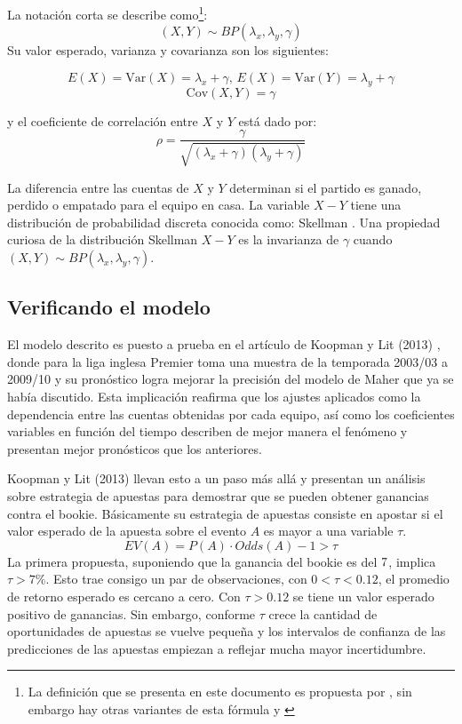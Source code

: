 La notación corta se describe como\footnote{La definición que se presenta en este documento es propuesta por \cite{koopman2013dynamic}, sin embargo hay otras variantes de esta fórmula \cite{kocherlakota1992bivariate} y \cite{johnson1997discrete}}:
\[(X,Y) \sim BP(\lambda_x,\lambda_y,\gamma)\]
Su valor esperado, varianza y covarianza son los siguientes:


\[E(X) = \mathrm{Var}(X) = \lambda_x + \gamma \text{, } E(X) = \mathrm{Var}(Y) = \lambda_y + \gamma\]
\[\mathrm{Cov}(X,Y) = \gamma\]


y el coeficiente de correlación entre $X$ y $Y$ está dado por:
\[\rho = \frac{\gamma}{\sqrt{(\lambda_x+\gamma)(\lambda_y+\gamma)}}\]

La diferencia entre las cuentas de $X$ y $Y$ determinan si el partido es ganado, perdido o empatado para el equipo en casa. La variable $X-Y$ tiene una distribución de probabilidad discreta conocida como: Skellman \cite{skellam1946frequency}. Una propiedad curiosa de la distribución Skellman $X-Y$ es la invarianza de $\gamma$ cuando $(X,Y) \sim BP(\lambda_x,\lambda_y,\gamma)$.

\subsection{Verificando el modelo}
\label{subsec:verification}

El modelo descrito es puesto a prueba en el artículo de Koopman y Lit (2013) \cite{koopman2013dynamic}, donde para la liga inglesa Premier toma una muestra de la temporada 2003/03 a 2009/10 y su pronóstico logra mejorar la precisión del modelo de Maher \cite{maher1982modelling} que ya se había discutido. Esta implicación reafirma que los ajustes aplicados como la dependencia entre las cuentas obtenidas por cada equipo, así como los coeficientes variables en función del tiempo describen de mejor manera el fenómeno y presentan mejor pronósticos que los anteriores.

Koopman y Lit (2013) \cite{koopman2013dynamic} llevan esto a un paso más allá y presentan un análisis sobre estrategia de apuestas para demostrar que se pueden obtener ganancias contra el bookie. Básicamente su estrategia de apuestas consiste en apostar si el valor esperado de la apuesta sobre el evento $A$ es mayor a una variable $\tau$.
\[EV(A) = P(A) \cdot Odds(A) - 1 > \tau\]
La primera propuesta, suponiendo que la ganancia del bookie es del $7\/$, implica $\tau > 7\%$. Esto trae consigo un par de observaciones, con $0<\tau<0.12$, el promedio de retorno esperado es cercano a cero. Con $\tau>0.12$ se tiene un valor esperado positivo de ganancias. Sin embargo, conforme $\tau$ crece  la cantidad de oportunidades de apuestas se vuelve pequeña y los intervalos de confianza de las predicciones de las apuestas empiezan a reflejar mucha mayor incertidumbre.

